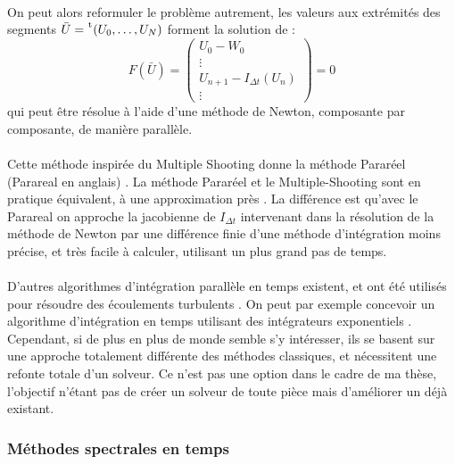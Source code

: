      \paragraph{}
      On peut alors reformuler le problème autrement, les valeurs aux extrémités des segments $\bar{U} = \mskip1mu\prescript{\smash{\mathrm t\mkern-3mu}}{}{\mathstrut\left(U_0, \dots, U_N\right)}$ forment la solution de :
      \[F\left(\bar{U}\right) = \begin{pmatrix}U_0 - W_0 \\ \vdots \\ U_{n+1} - I_{\Delta t}\left(U_n\right) \\ \vdots\end{pmatrix} = 0\]
      qui peut être résolue à l'aide d'une méthode de Newton, composante par composante, de manière parallèle.

      \paragraph{}
      Cette méthode inspirée du Multiple Shooting \cite{Nievergelt1964} donne la méthode Pararéel (Parareal en anglais) \cite{LionsMadayTurinici2001}.
      La méthode Pararéel et le Multiple-Shooting sont en pratique équivalent, à une approximation près \cite{GanderVandewalle2007}.
      La différence est qu'avec le Parareal on approche la jacobienne de $I_{\Delta t}$ intervenant dans la résolution de la méthode de Newton par une différence finie d'une méthode d'intégration moins précise, et très facile à calculer, utilisant un plus grand pas de temps.

      \paragraph{}
      D'autres algorithmes d'intégration parallèle en temps existent, et ont été utilisés pour résoudre des écoulements turbulents \cite{Lunet2018}.
      On peut par exemple concevoir un algorithme d'intégration en temps utilisant des intégrateurs exponentiels \cite{GanderGuettel2013}.
      Cependant, si de plus en plus de monde semble s'y intéresser, ils se basent sur une approche totalement différente des méthodes classiques, et nécessitent une refonte totale d'un solveur.
      Ce n'est pas une option dans le cadre de ma thèse, l'objectif n'étant pas de créer un solveur de toute pièce mais d'améliorer un déjà existant.


    \subsubsection{Méthodes spectrales en temps}

